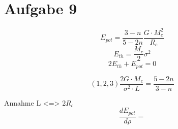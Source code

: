 \section{Aufgabe 9}

\begin{equation}
E_{pot}= \frac{3-n}{5-2n} \frac{G \cdot M^2_c}{R_c}
\end{equation}
\begin{equation}
E_{th}= \frac{M_c}{2} \sigma^2
\end{equation}
\begin{equation}
2 E_{th} + E_{pot} = 0
\end{equation}

\begin{equation}
(1,2,3) \frac{2G \cdot M_c}{\sigma^2 \cdot L} = \frac{5-2n}{3-n}
\end{equation}

Annahme L <=> 2$R_c$
\begin{equation}
\frac{dE_{pot}}{d\rho} = 
\end{equation}

